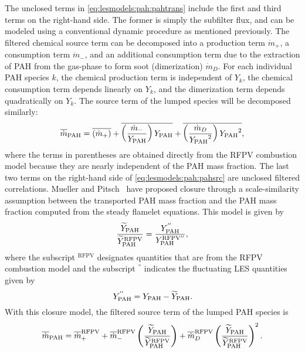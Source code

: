 The unclosed terms in \cref{eq:lesmodels:pah:pahtrans} include the first and third terms on the right-hand side. The former is simply the subfilter flux, and can be modeled using a conventional dynamic procedure as mentioned previously. The filtered chemical source term can be decomposed into a production term $\dot{m}_{+}$, a consumption term $\dot{m}_{-}$, and an additional consumption term due to the extraction of PAH from the gas-phase to form soot (dimerization) $\dot{m}_{D}$. For each individual PAH species $k$, the chemical production term is independent of $Y_k$, the chemical consumption term depends linearly on $Y_k$, and the dimerization term depends quadratically on $Y_k$. The source term of the lumped species will be decomposed similarly:
\begin{equation}\label{eq:lesmodels:pah:pahsrc}
  \fst[m]{\text{PAH}} = \mean{(\dot{m}_{+})} + \mean{\left( \frac{\dot{m}_{-}}{Y_{\text{PAH}}} \right) Y_{\text{PAH}}} + \mean{\left( \frac{\dot{m}_{D}}{{Y_{\text{PAH}}}^2} \right) {Y_{\text{PAH}}}^2},
\end{equation}
where the terms in parentheses are obtained directly from the RFPV combustion model because they are nearly independent of the PAH mass fraction. The last two terms on the right-hand side of \cref{eq:lesmodels:pah:pahsrc} are unclosed filtered correlations. Mueller and Pitsch~\cite{mueller2012} have proposed closure through a scale-similarity assumption between the transported PAH mass fraction and the PAH mass fraction computed from the steady flamelet equations. This model is given by
\begin{equation}\label{eq:lesmodels:pah:similarity}
  \frac{\tf{Y}_{\text{PAH}}}{\tf{Y}_{\text{PAH}}^{\text{RFPV}}} = \frac{Y_{\text{PAH}}^{''}}{Y_{\text{PAH}}^{\text{RFPV}''}},
\end{equation}
where the subscript $^{\text{RFPV}}$ designates quantities that are from the RFPV combustion model and the subscript $^{''}$ indicates the fluctuating LES quantities given by
\begin{equation}\label{eq:lesmodels:pah:residual}
  Y_{\text{PAH}}^{''} = Y_{\text{PAH}} - \tf{Y}_{\text{PAH}}.
\end{equation}
With this closure model, the filtered source term of the lumped PAH species is
\begin{equation}\label{eq:lesmodels:pah:pahsrcmodeled}
  \fst[m]{\text{PAH}} = \mean{\dot{m}}_{+}^{\text{RFPV}} + \mean{\dot{m}}_{-}^{\text{RFPV}}\left( \frac{\tf{Y}_{\text{PAH}}}{\tf{Y}_{\text{PAH}}^{\text{RFPV}}} \right) + \mean{\dot{m}}_{D}^{\text{RFPV}}\left( \frac{\tf{Y}_{\text{PAH}}}{\tf{Y}_{\text{PAH}}^{\text{RFPV}}} \right)^2.
\end{equation}
